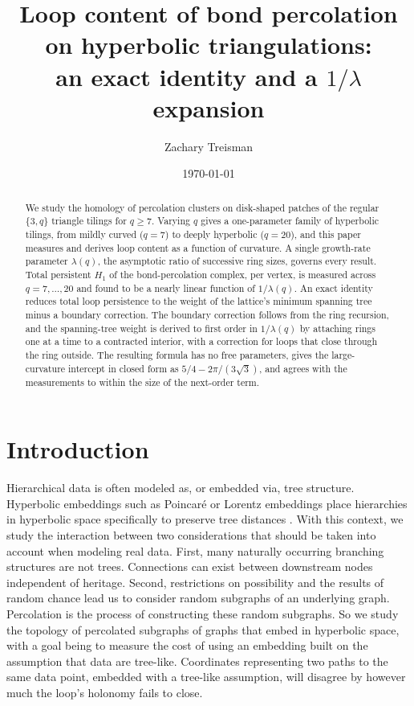 \documentclass[11pt]{article}
\title{Loop content of bond percolation on hyperbolic triangulations:\\ an exact identity and a $1/\lambda$ expansion}
\author{Zachary Treisman}
\date{\today}
\begin{document}
\maketitle

\begin{abstract}
We study the homology of percolation clusters on disk-shaped patches of the regular $\{3,q\}$ triangle tilings for $q\ge7$. Varying $q$ gives a one-parameter family of hyperbolic tilings, from mildly curved ($q=7$) to deeply hyperbolic ($q=20$), and this paper measures and derives loop content as a function of curvature. A single growth-rate parameter $\lambda(q)$, the asymptotic ratio of successive ring sizes, governs every result. Total persistent $H_1$ of the bond-percolation complex, per vertex, is measured across $q=7,\dots,20$ and found to be a nearly linear function of $1/\lambda(q)$. An exact identity reduces total loop persistence to the weight of the lattice's minimum spanning tree minus a boundary correction. The boundary correction follows from the ring recursion, and the spanning-tree weight is derived to first order in $1/\lambda(q)$ by attaching rings one at a time to a contracted interior, with a correction for loops that close through the ring outside. The resulting formula has no free parameters, gives the large-curvature intercept in closed form as $5/4-2\pi/(3\sqrt3)$, and agrees with the measurements to within the size of the next-order term.
\end{abstract}

\section{Introduction}
\label{sec:intro}

Hierarchical data is often modeled as, or embedded via, tree structure. Hyperbolic embeddings such as Poincar\'{e} or Lorentz embeddings place hierarchies in hyperbolic space specifically to preserve tree distances \citep{nickel2017}. With this context, we study the interaction between two considerations that should be taken into account when modeling real data. First, many naturally occurring branching structures are not trees. Connections can exist between downstream nodes independent of heritage. Second, restrictions on possibility and the results of random chance lead us to consider random subgraphs of an underlying graph. Percolation is the process of constructing these random subgraphs. So we study the topology of percolated subgraphs of graphs that embed in hyperbolic space, with a goal being to measure the cost of using an embedding built on the assumption that data are tree-like. Coordinates representing two paths to the same data point, embedded with a tree-like assumption, will disagree by however much the loop's holonomy fails to close.
\end{document}
